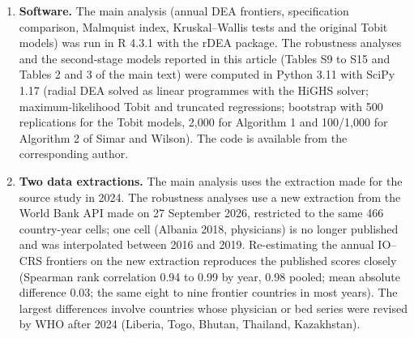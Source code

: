\documentclass[11pt,letterpaper]{article}
\begin{document}
\begin{enumerate}
\item \textbf{Software.} The main analysis (annual DEA frontiers, specification comparison, Malmquist index, Kruskal--Wallis tests and the original Tobit models) was run in R 4.3.1 with the rDEA package.\citep{valenzuela2024} The robustness analyses and the second-stage models reported in this article (Tables S9 to S15 and Tables 2 and 3 of the main text) were computed in Python 3.11 with SciPy 1.17 (radial DEA solved as linear programmes with the HiGHS solver; maximum-likelihood Tobit and truncated regressions; bootstrap with 500 replications for the Tobit models, 2,000 for Algorithm 1 and 100/1,000 for Algorithm 2 of Simar and Wilson). The code is available from the corresponding author.
\item \textbf{Two data extractions.} The main analysis uses the extraction made for the source study in 2024. The robustness analyses use a new extraction from the World Bank API made on 27 September 2026, restricted to the same 466 country-year cells; one cell (Albania 2018, physicians) is no longer published and was interpolated between 2016 and 2019. Re-estimating the annual IO--CRS frontiers on the new extraction reproduces the published scores closely (Spearman rank correlation 0.94 to 0.99 by year, 0.98 pooled; mean absolute difference 0.03; the same eight to nine frontier countries in most years). The largest differences involve countries whose physician or bed series were revised by WHO after 2024 (Liberia, Togo, Bhutan, Thailand, Kazakhstan).
\end{enumerate}
\end{document}
